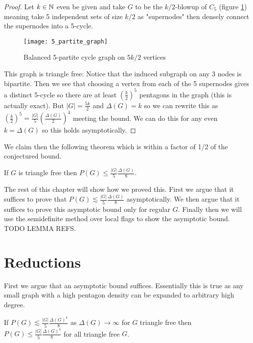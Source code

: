 \begin{proof}
    Let $k\in\mathbb{N}$ even be given and take $G$ to be the $k/2$-blowup of $C_5$
    (figure \ref{fig:5_partite_graph}) meaning take 5 independent sets of size $k/2$ as
    "supernodes" then densely connect the supernodes into a 5-cycle.
    \begin{figure}[ht]
        \centering
        \texttt{[image: 5\_partite\_graph]}
        \caption{Balanced 5-partite cycle graph on $5k/2$ vertices}
        \label{fig:5_partite_graph}
    \end{figure}
    This graph is triangle free: Notice that the induced subgraph on any 3 nodes is bipartite.
    Then we see that choosing
    a vertex from each of the 5 supernodes gives a distinct 5-cycle so there are at
    least $\left(\frac{k}{2}\right)^5$ pentagons in the graph (this is actually exact). But
    $|G|=\frac{5k}{2}$ and $\Delta(G)=k$ so we can rewrite this as
    $\left(\frac{k}{2}\right)^5 = \frac{|G|}{5}\left(\frac{\Delta(G)}{2}\right)^4$ meeting
    the bound. We can do this for any even $k=\Delta(G)$ so this holds asymptotically.
\end{proof}

We claim then the following theorem which is within a factor of 1/2 of the conjectured
bound.

\begin{theorem}
    \label{thm:local_pentagon_bound}
    If $G$ is triangle free then
    $P(G) \leq \frac{|G|}{5}\frac{\Delta(G)}{8}$.
\end{theorem}

The rest of this chapter will show how we proved this. First we argue that it suffices
to prove that $P(G) \lesssim \frac{|G|}{5}\frac{\Delta(G)}{8}$ asymptotically.
We then argue that it suffices to prove this asymptotic bound only for regular $G$.
Finally then we will use the semidefinite method over local flags to show the
asymptotic bound. TODO LEMMA REFS.

\section{Reductions}

First we argue that an asymptotic bound suffices. Essentially this is true as any small
graph with a high pentagon density can be expanded to arbitrary high degree.
\begin{lemma}
    \label{lemma:pentagon_asymp_suffices}
    If $P(G) \lesssim \frac{|G|}{5}\frac{\Delta(G)^4}{8}$ as $\Delta(G)\to\infty$ for
    $G$ triangle free
    then $P(G) \leq \frac{|G|}{5}\frac{\Delta(G)^4}{8}$ for all triangle free $G$.
\end{lemma}

